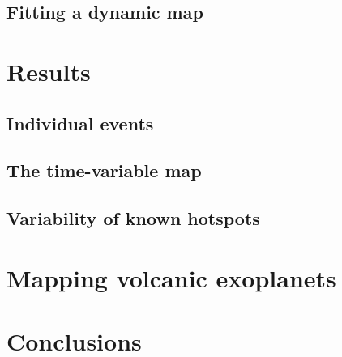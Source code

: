 \documentclass[modern]{aastex62}
\begin{document}
\subsection{Fitting a dynamic map}
\label{ssec:dynamic_map}

\section{Results}
\label{sec:results}

\subsection{Individual events}
\label{ssec:individual}

\subsection{The time-variable map}
\label{ssec:time_variable_map}
%

\subsection{Variability of known hotspots}
\label{ssec:variability_hotspots}

\section{Mapping volcanic exoplanets}
\label{sec:exoplanets}

\section{Conclusions}
\label{sec:conclusions}


\end{document}

